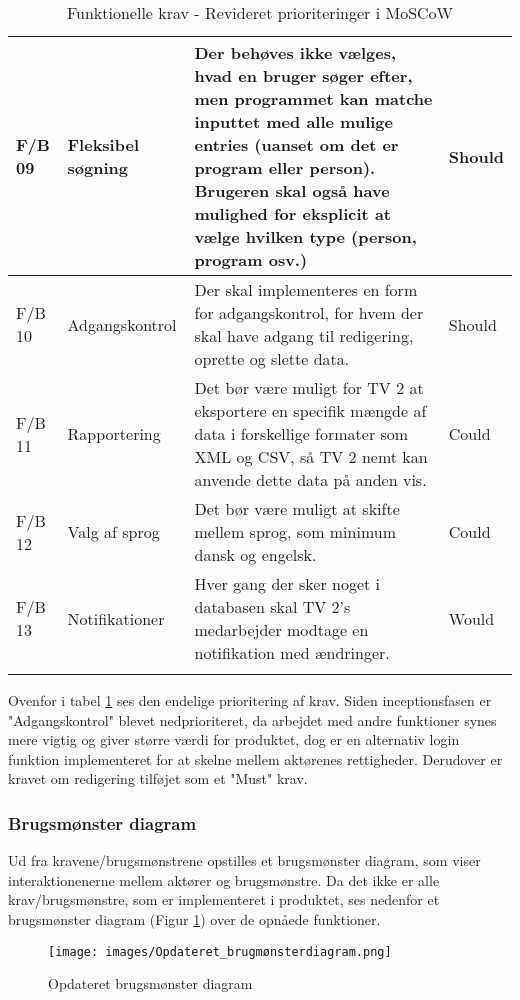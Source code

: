 \begin{longtable}{|p{10mm}|p{40mm}|p{70mm}|p{20mm}|}
    \hline
    F/B 09 & Fleksibel søgning & Der behøves ikke vælges, hvad en bruger søger efter, men programmet kan matche inputtet med alle mulige entries (uanset om det er program eller person). Brugeren skal også have mulighed for eksplicit at vælge hvilken type (person, program osv.) & Should \\
    \hline
    F/B 10 & Adgangskontrol & Der skal implementeres en form for adgangskontrol, for hvem der skal have adgang til redigering, oprette og slette data. & Should \\
    \hline
    F/B 11 & Rapportering & Det bør være muligt for TV 2 at eksportere en specifik  mængde af data i forskellige formater som XML og CSV, så TV 2 nemt kan anvende dette data på anden vis. & Could \\
    \hline
    F/B 12 & Valg af sprog & Det bør være muligt at skifte mellem sprog, som minimum dansk og engelsk. & Could \\\hline
    F/B 13 & Notifikationer & Hver gang der sker noget i databasen skal TV 2's medarbejder modtage en notifikation med ændringer. & Would \\
    \hline
    \caption{Funktionelle krav - Revideret prioriteringer i MoSCoW}
    \label{tab:FuncMoscow}
\end{longtable}

Ovenfor i tabel \ref{tab:FuncMoscow} ses den endelige prioritering af krav. Siden inceptionsfasen er "Adgangskontrol" blevet nedprioriteret, da arbejdet med andre funktioner synes mere vigtig og giver større værdi for produktet, dog er en alternativ login funktion implementeret for at skelne mellem aktørenes rettigheder. Derudover er kravet om redigering tilføjet som et "Must" krav.

\subsubsection{Brugsmønster diagram}
Ud fra kravene/brugsmønstrene opstilles et brugsmønster diagram, som viser interaktionenerne mellem aktører og brugsmønstre. Da det ikke er alle krav/brugsmønstre, som er implementeret i produktet, ses nedenfor et brugsmønster diagram (Figur \ref{fig:brugsmønster}) over de opnåede funktioner. 

\begin{figure}[H]
    \centering
\texttt{[image: images/Opdateret\_brugmønsterdiagram.png]}
    \caption{Opdateret brugsmønster diagram}
    \label{fig:brugsmønster}
\end{figure}

